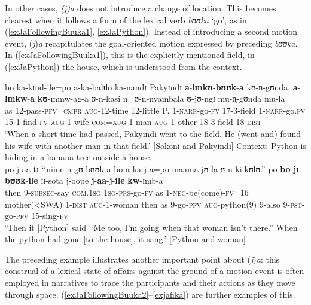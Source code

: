 In other cases, \textit{(j)a} does not introduce a change of location. This becomes clearest when it follows a form of the lexical verb \textit{bʊʊka} \lq go', as in (\ref{exJaFollowingBuuka1}, \ref{exJaPython}). Instead of introducing a second motion event, (\textit{j})\textit{a} recapitulates the goal-oriented motion expressed by preceding \textit{bʊʊka}. In (\ref{exJaFollowingBuuka1}), this is the explicitly mentioned field, in (\ref{exJaPython}) the house, which is understood from the context.
\begin{exe}
\ex \label{exJaFollowingBuuka1}\gll bo ka-kɪnd-ile=po a-ka-balɪlo ka-nandɪ Pakyɪndɪ \textbf{a}-\textbf{lɪnkʊ}-\textbf{bʊʊk}-\textbf{a} kʊ-n̩-gʊnda. \textbf{a}-\textbf{lɪnkw}-\textbf{a} \textbf{kʊ}-mmw-ag-a ʊ-n-kasi n=ʊ-n-nyambala ʊ-jʊ-ngɪ mu-n̩-gʊnda mu-la\\
as 12-pass-\textsc{pfv}=\textsc{cmpr} \textsc{aug}-12-time 12-little P. 1-\textsc{narr}-go-\textsc{fv} 17-3-field 1-\textsc{narr}-go.\textsc{fv} 15-1-find-\textsc{fv} \textsc{aug}-1-wife \textsc{com}=\textsc{aug}-1-man \textsc{aug}-1-other 18-3-field 18-\textsc{dist}\\
\glt `When a short time had passed, Pakyindi went to the field. He (went and) found his wife with another man in that field.' [Sokoni and Pakyindi]
\ex \label{exJaPython}
Context: Python is hiding in a banana tree outside a house.\\
\gll po j-aa-tɪ \textup{\lq\lq}niine n-gʊ-bʊʊk-a bo a-ka-j-a=po maama jʊ-la ʊ-n-kiikʊlʊ.\textup{''} po \textbf{bo} \textbf{jɪ}-\textbf{bʊʊk}-\textbf{ile} ɪɪ-sota j-oope \textbf{j}-\textbf{aa}-\textbf{j}-\textbf{ile} \textbf{kw}-ɪmb-a\\
then 9-\textsc{subsec}-say \phantom{\lq\lq}\textsc{com.1sg} \textsc{1sg}-\textsc{prs}-go-\textsc{fv} as 1-\textsc{neg}-be(come)-\textsc{fv}=16 mother(<SWA) 1-\textsc{dist} \textsc{aug}-1-woman then as 9-go-\textsc{pfv} \textsc{aug}-python(9) 9-also 9-\textsc{pst}-go-\textsc{pfv} 15-sing-\textsc{fv}\\
\glt \lq Then it [Python] said \lq\lq Me too, I'm going when that woman isn't there.''  ‎‎When the python had gone [to the house], it sang.' [Python and woman]
\end{exe}
 
The preceding example illustrates another important point about (\textit{j})\textit{a}: this construal of a lexical state-of-affairs against the ground of a motion event is often employed in narratives to trace the participants and their actions as they move through space. (\ref{exJaFollowingBuuka2}--\ref{exjafika}) are further examples of this.

